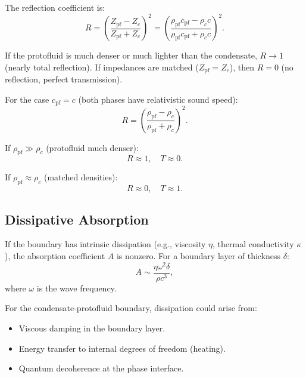 \documentclass[11pt,a4paper]{article}
\theoremstyle{definition}
\theoremstyle{remark}
\begin{document}
The reflection coefficient is:
\begin{equation}
R = \left(\frac{Z_{\mathrm{pf}} - Z_c}{Z_{\mathrm{pf}} + Z_c}\right)^2 = \left(\frac{\rho_{\mathrm{pf}} c_{\mathrm{pf}} - \rho_c c}{\rho_{\mathrm{pf}} c_{\mathrm{pf}} + \rho_c c}\right)^2.
\end{equation}

If the protofluid is much denser or much lighter than the condensate, $R \to 1$ (nearly total reflection). If impedances are matched ($Z_{\mathrm{pf}} = Z_c$), then $R = 0$ (no reflection, perfect transmission).

For the case $c_{\mathrm{pf}} = c$ (both phases have relativistic sound speed):
\begin{equation}
R = \left(\frac{\rho_{\mathrm{pf}} - \rho_c}{\rho_{\mathrm{pf}} + \rho_c}\right)^2.
\end{equation}

If $\rho_{\mathrm{pf}} \gg \rho_c$ (protofluid much denser):
\begin{equation}
R \approx 1, \quad T \approx 0.
\end{equation}

If $\rho_{\mathrm{pf}} \approx \rho_c$ (matched densities):
\begin{equation}
R \approx 0, \quad T \approx 1.
\end{equation}

\subsection{Dissipative Absorption}
\label{sec:dissipation}

If the boundary has intrinsic dissipation (e.g., viscosity $\eta$, thermal conductivity $\kappa$), the absorption coefficient $A$ is nonzero. For a boundary layer of thickness $\delta$:
\begin{equation}
A \sim \frac{\eta \omega^2 \delta}{\rho c^3},
\end{equation}
where $\omega$ is the wave frequency.

For the condensate-protofluid boundary, dissipation could arise from:
\begin{itemize}[leftmargin=*, itemsep=0.2em]
\item Viscous damping in the boundary layer.
\item Energy transfer to internal degrees of freedom (heating).
\item Quantum decoherence at the phase interface.
\end{itemize}
\end{document}
